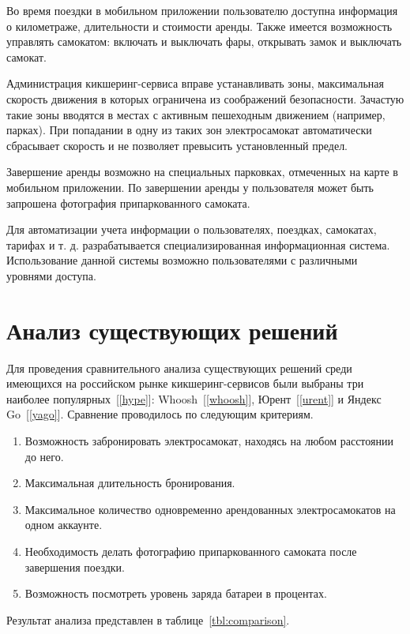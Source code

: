 Во время поездки в мобильном приложении пользователю доступна информация о километраже, длительности и стоимости аренды. Также имеется возможность управлять самокатом: включать и выключать фары, открывать замок и выключать самокат.

Администрация кикшеринг-сервиса вправе устанавливать зоны, максимальная скорость движения в которых ограничена из соображений безопасности. Зачастую такие зоны вводятся в местах с активным пешеходным движением (например, парках). При попадании в одну из таких зон электросамокат автоматически сбрасывает скорость и не позволяет превысить установленный предел.

Завершение аренды возможно на специальных парковках, отмеченных на карте в мобильном приложении. По завершении аренды у пользователя может быть запрошена фотография припаркованного самоката.

Для автоматизации учета информации о пользователях, поездках, самокатах, тарифах и т. д. разрабатывается специализированная информационная система. Использование данной системы возможно пользователями с различными уровнями доступа.

\section{Анализ существующих решений}

Для проведения сравнительного анализа существующих решений среди имеющихся на российском рынке кикшеринг-сервисов были выбраны три наиболее популярных~[\ref{hype}]: Whoosh~[\ref{whoosh}], Юрент~[\ref{urent}] и Яндекс Go~[\ref{yago}]. Сравнение проводилось по следующим критериям.

\begin{enumerate}
	\item Возможность забронировать электросамокат, находясь на любом расстоянии до него.
	\item Максимальная длительность бронирования.
	\item Максимальное количество одновременно арендованных электросамокатов на одном аккаунте.
	\item Необходимость делать фотографию припаркованного самоката после завершения поездки.
	\item Возможность посмотреть уровень заряда батареи в процентах.
\end{enumerate}

Результат анализа представлен в таблице~\ref{tbl:comparison}.

